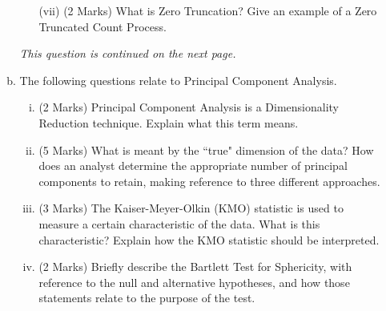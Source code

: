 \documentclass[a4paper,12pt]{article}
\begin{document}
\begin{enumerate}
\begin{enumerate}[(a)]
\begin{itemize}
	

	
	
	
	\item[(vii)] (2 Marks) What is Zero Truncation? Give an example of a Zero Truncated Count Process.
\end{itemize}
\noindent \textit{This question is continued on the next page.}
\newpage
\item 
The following questions relate to Principal Component Analysis.
\begin{enumerate}[(i)]

	\item (2 Marks) Principal Component Analysis is a Dimensionality Reduction technique. Explain what this term means.
	\item (5 Marks)	What is meant by the ``true" dimension of the data?  How does an analyst determine the appropriate number of principal components to retain, making reference to three different approaches.
	\item (3 Marks) The Kaiser-Meyer-Olkin (KMO) statistic is used to measure a certain characteristic of the data. What is this characteristic? Explain how the KMO statistic should be interpreted.
	\item (2 Marks) Briefly describe the Bartlett Test for Sphericity, with reference to the null and alternative hypotheses, and how those statements relate to the purpose of the test.
\end{enumerate} 




\end{enumerate}


\end{enumerate}
\end{document}
